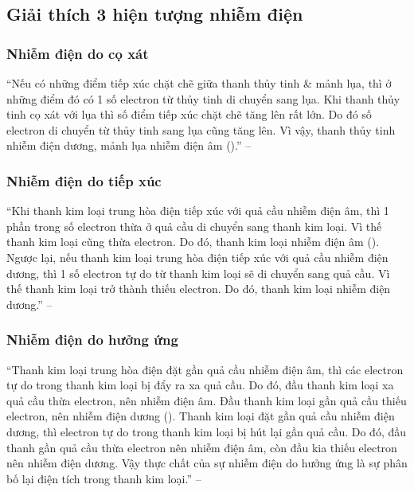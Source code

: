 \documentclass[oneside]{book}
\numberwithin{equation}{section}
\begin{document}
\subsection{Giải thích 3 hiện tượng nhiễm điện}

\subsubsection{Nhiễm điện do cọ xát}
``Nếu có những điểm tiếp xúc chặt chẽ giữa thanh thủy tinh \& mảnh lụa, thì ở những điểm đó có 1 số electron từ thủy tinh di chuyển sang lụa. Khi thanh thủy tinh cọ xát với lụa thì số điểm tiếp xúc chặt chẽ tăng lên rất lớn. Do đó số electron di chuyển từ thủy tinh sang lụa cũng tăng lên. Vì vậy, thanh thủy tinh nhiễm điện dương, mảnh lụa nhiễm điện âm (\cite[Hình 2.3: \textsf{Nhiễm điện do cọ xát}, p. 11]{SGK_Vat_Ly_11_nang_cao}).'' -- \cite[p. 11]{SGK_Vat_Ly_11_nang_cao}

\subsubsection{Nhiễm điện do tiếp xúc}
``Khi thanh kim loại trung hòa điện tiếp xúc với quả cầu nhiễm điện âm, thì 1 phần trong số electron thừa ở quả cầu di chuyển sang thanh kim loại. Vì thế thanh kim loại cũng thừa electron. Do đó, thanh kim loại nhiễm điện âm (\cite[Hình 2.4: \textsf{Nhiễm điện do tiếp xúc}, p.11]{SGK_Vat_Ly_11_nang_cao}). Ngược lại, nếu thanh kim loại trung hòa điện tiếp xúc với quả cầu nhiễm điện dương, thì 1 số electron tự do từ thanh kim loại sẽ di chuyển sang quả cầu. Vì thế thanh kim loại trở thành thiếu electron. Do đó, thanh kim loại nhiễm điện dương.'' -- \cite[p. 11]{SGK_Vat_Ly_11_nang_cao}

\subsubsection{Nhiễm điện do hưởng ứng}
``Thanh kim loại trung hòa điện đặt gần quả cầu nhiễm điện âm, thì các electron tự do trong thanh kim loại bị đẩy ra xa quả cầu. Do đó, đầu thanh kim loại xa quả cầu thừa electron, nên nhiễm điện âm. Đầu thanh kim loại gần quả cầu thiếu electron, nên nhiễm điện dương (\cite[Hình 2.5: \textsf{Nhiễm điện do hưởng ứng}, p.11]{SGK_Vat_Ly_11_nang_cao}). Thanh kim loại đặt gần quả cầu nhiễm điện dương, thì electron tự do trong thanh kim loại bị hút lại gần quả cầu. Do đó, đầu thanh gần quả cầu thừa electron nên nhiễm điện âm, còn đầu kia thiếu electron nên nhiễm điện dương. Vậy thực chất của sự nhiễm điện do hưởng ứng là sự phân bố lại điện tích trong thanh kim loại.'' -- \cite[pp. 11--12]{SGK_Vat_Ly_11_nang_cao}
\end{document}
